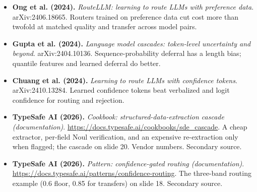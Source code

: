 \documentclass[11pt,letterpaper]{article}
\begin{document}
\begin{itemize}[leftmargin=1.2em,itemsep=3pt]
\item \textbf{Ong et al. (2024).} \textit{RouteLLM: learning to route LLMs with preference data}. arXiv:2406.18665. Routers trained on preference data cut cost more than twofold at matched quality and transfer across model pairs.
\item \textbf{Gupta et al. (2024).} \textit{Language model cascades: token-level uncertainty and beyond}. arXiv:2404.10136. Sequence-probability deferral has a length bias; quantile features and learned deferral do better.
\item \textbf{Chuang et al. (2024).} \textit{Learning to route LLMs with confidence tokens}. arXiv:2410.13284. Learned confidence tokens beat verbalized and logit confidence for routing and rejection.
\item \textbf{TypeSafe AI (2026).} \textit{Cookbook: structured-data-extraction cascade (documentation)}. \url{https://docs.typesafe.ai/cookbooks/sde_cascade}. A cheap extractor, per-field Noul verification, and an expensive re-extraction only when flagged; the cascade on slide 20. Vendor numbers. Secondary source.
\item \textbf{TypeSafe AI (2026).} \textit{Pattern: confidence-gated routing (documentation)}. \url{https://docs.typesafe.ai/patterns/confidence-routing}. The three-band routing example (0.6 floor, 0.85 for transfers) on slide 18. Secondary source.
\end{itemize}
\end{document}

